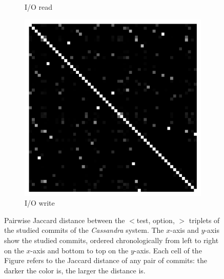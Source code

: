 \begin{figure}[t]
\begin{subfigure}{0.19\textwidth}
                \caption{I/O read}
        \end{subfigure}
        \begin{subfigure}{0.19\textwidth}
                \includegraphics[width=\linewidth]{Figures/cassandra-iowrite-commitX.pdf}
                \caption{I/O write}
        \end{subfigure}
        
	\caption{Pairwise Jaccard distance between the $<$test, option, \inconsistent$>$ triplets of the studied commits of the \emph{Cassandra} system. The $x$-axis and $y$-axis show the studied commits, ordered chronologically from left to right on the $x$-axis and bottom to top on the $y$-axis. Each cell of the Figure refers to the Jaccard distance of any pair of commits: the darker the color is, the larger the distance is.}
	\label{fig:across-commit-cassandra}
\end{figure}





